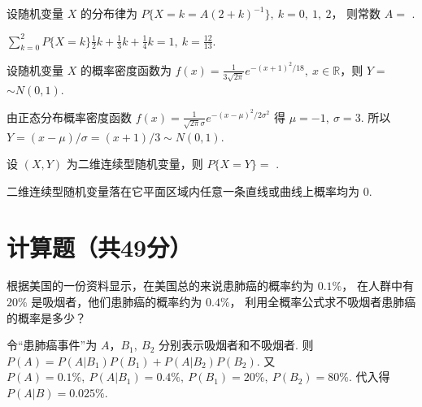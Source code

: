 \begin{problem}
  设随机变量 $X$ 的分布律为 $P\{X = k = A(2 + k)^{-1}\},~ k = 0,~ 1,~ 2$，
  则常数 $A = $ .
\end{problem}
\begin{solution}
  $ \sum_{k = 0}^2 P\{X = k\} \frac12 k + \frac13 k + \frac14 k = 1,~
    k = \frac{12}{13}$.
\end{solution}

\begin{problem}
  设随机变量 $X$ 的概率密度函数为 $f(x) = \frac{1}{3\sqrt{2\pi}}e^{-(x + 1)^2/18},~
  x \in \mathbb R$，则 $Y = $  $\sim N(0,1)$.
\end{problem}
\begin{solution}
  由正态分布概率密度函数
  $f(x) = \frac{1}{\sqrt{2\pi}\sigma}e^{-(x - \mu)^2/2\sigma^2}$
  得 $\mu = -1,~ \sigma = 3$.
  所以 $Y = (x - \mu)/\sigma = (x + 1)/3 \sim N(0,1)$.
\end{solution}

\begin{problem}
  设 $(X,Y)$ 为二维连续型随机变量，则 $P\{X = Y\} = $ .
\end{problem}
\begin{solution}
  二维连续型随机变量落在它平面区域内任意一条直线或曲线上概率均为 $0$.
\end{solution}

\section{计算题（共49分）}

\begin{problem}[本题5分]
  根据美国的一份资料显示，在美国总的来说患肺癌的概率约为 $0.1\%$，
  在人群中有 $20\%$ 是吸烟者，他们患肺癌的概率约为 $0.4\%$，
  利用全概率公式求不吸烟者患肺癌的概率是多少？
\end{problem}
\begin{solution}
  令``患肺癌事件''为 $A$，$B_1,~ B_2$ 分别表示吸烟者和不吸烟者.
  则 $P(A) = P(A|B_1)P(B_1) + P(A|B_2)P(B_2)$.
  又 $P(A) = 0.1\%,~ P(A|B_1) = 0.4\%,~ P(B_1) = 20\%,~ P(B_2) = 80\%$.
  代入得 $P(A|B) = 0.025\%$.
\end{solution}

